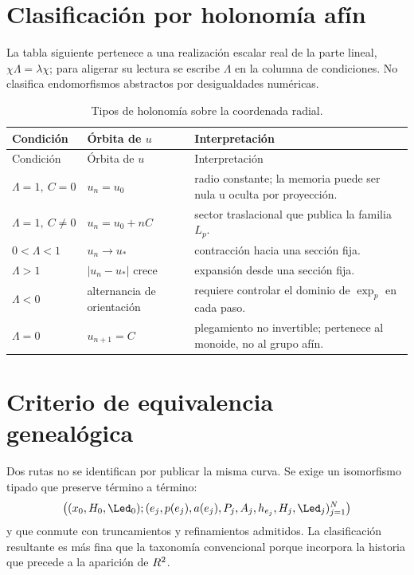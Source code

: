 \section{Clasificación por holonomía afín}

La tabla siguiente pertenece a una realización escalar real de la parte
lineal, \(\chi\Lambda=\lambda\chi\); para aligerar su lectura se escribe
\(\Lambda\) en la columna de condiciones. No clasifica endomorfismos
abstractos por desigualdades numéricas.

\begin{longtable}{p{}p{}p{}}
\caption{Tipos de holonomía sobre la coordenada radial.}
\label{espiral:tab:tipos-holonomia}\\
\toprule
Condición&Órbita de \(u\)&Interpretación\\
\midrule
\endfirsthead
\toprule
Condición&Órbita de \(u\)&Interpretación\\
\midrule
\endhead
\(\Lambda=1,\ C=0\)&\(u_n=u_0\)&radio constante; la memoria puede ser
nula u oculta por proyección.\\
\(\Lambda=1,\ C\neq0\)&\(u_n=u_0+nC\)&sector traslacional que publica la
familia \(L_p\).\\
\(0<\Lambda<1\)&\(u_n\to u_*\)&contracción hacia una sección fija.\\
\(\Lambda>1\)&\(|u_n-u_*|\) crece&expansión desde una sección fija.\\
\(\Lambda<0\)&alternancia de orientación&requiere controlar el dominio de
\(\exp_p\) en cada paso.\\
\(\Lambda=0\)&\(u_{n+1}=C\)&plegamiento no invertible; pertenece al
monoide, no al grupo afín.\\
\bottomrule
\end{longtable}

\section{Criterio de equivalencia genealógica}

Dos rutas no se identifican por publicar la misma curva. Se exige un
isomorfismo tipado que preserve término a término:
\[
 \bigl(
 (x_0,H_0,\Led_0);
 (\widehat e_j,p(\widehat e_j),a(\widehat e_j),P_j,A_j,
 h_{e_j},H_j,\Led_j)_{j=1}^{N}
 \bigr)
\]
y que conmute con truncamientos y refinamientos admitidos. La clasificación
resultante es más fina que la taxonomía convencional porque incorpora la
historia que precede a la aparición de \(R^2\).

